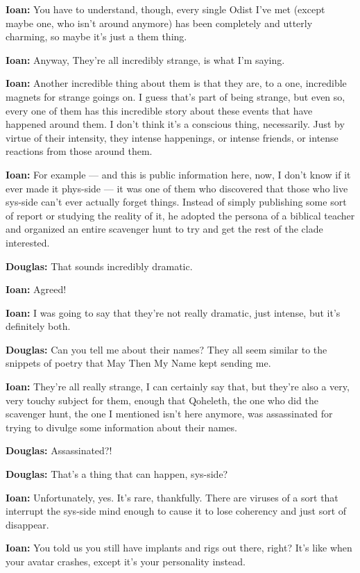 \textbf{Ioan:} You have to understand, though, every single Odist I've met (except maybe one, who isn't around anymore) has been completely and utterly charming, so maybe it's just a them thing.

\textbf{Ioan:} Anyway, They're all incredibly strange, is what I'm saying.

\textbf{Ioan:} Another incredible thing about them is that they are, to a one, incredible magnets for strange goings on. I guess that's part of being strange, but even so, every one of them has this incredible story about these events that have happened around them. I don't think it's a conscious thing, necessarily. Just by virtue of their intensity, they intense happenings, or intense friends, or intense reactions from those around them.

\textbf{Ioan:} For example — and this is public information here, now, I don't know if it ever made it phys-side — it was one of them who discovered that those who live sys-side can't ever actually forget things. Instead of simply publishing some sort of report or studying the reality of it, he adopted the persona of a biblical teacher and organized an entire scavenger hunt to try and get the rest of the clade interested.

\textbf{Douglas:} That sounds incredibly dramatic.

\textbf{Ioan:} Agreed!

\textbf{Ioan:} I was going to say that they're not really dramatic, just intense, but it's definitely both.

\textbf{Douglas:} Can you tell me about their names? They all seem similar to the snippets of poetry that May Then My Name kept sending me.

\textbf{Ioan:} They're all really strange, I can certainly say that, but they're also a very, very touchy subject for them, enough that Qoheleth, the one who did the scavenger hunt, the one I mentioned isn't here anymore, was assassinated for trying to divulge some information about their names.

\textbf{Douglas:} Assassinated?!

\textbf{Douglas:} That's a thing that can happen, sys-side?

\textbf{Ioan:} Unfortunately, yes. It's rare, thankfully. There are viruses of a sort that interrupt the sys-side mind enough to cause it to lose coherency and just sort of disappear.

\textbf{Ioan:} You told us you still have implants and rigs out there, right? It's like when your avatar crashes, except it's your personality instead.

